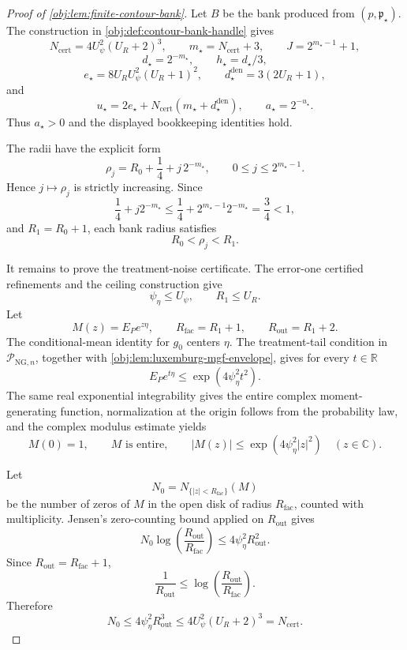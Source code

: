 \documentclass[11pt]{article}
\begin{document}
\begin{proof}[Proof of \cref{obj:lem:finite-contour-bank}]
Let \(B\) be the bank produced from \((p,\mathfrak p_\star)\).  The construction in \cref{obj:def:contour-bank-handle} gives
\[
N_{\mathrm{cert}}=4U_\psi^2(U_R+2)^3,\qquad
m_\star=N_{\mathrm{cert}}+3,\qquad
J=2^{m_\star-1}+1,
\]
\[
d_\star=2^{-m_\star},\qquad h_\star=d_\star/3,
\]
\[
e_\star=8U_RU_\psi^2(U_R+1)^2,\qquad
d_\star^{\mathrm{den}}=3(2U_R+1),
\]
and
\[
u_\star=2e_\star+N_{\mathrm{cert}}(m_\star+d_\star^{\mathrm{den}}),
\qquad
a_\star=2^{-u_\star}.
\]
Thus \(a_\star>0\) and the displayed bookkeeping identities hold. %

The radii have the explicit form
\[
\rho_j=R_0+\frac14+j\,2^{-m_\star},
\qquad 0\le j\le 2^{m_\star-1}.
\]
Hence \(j\mapsto\rho_j\) is strictly increasing.  Since
\[
\frac14+j2^{-m_\star}\le \frac14+2^{m_\star-1}2^{-m_\star}=\frac34<1,
\]
and \(R_1=R_0+1\), each bank radius satisfies
\[
R_0<\rho_j<R_1.
\]

It remains to prove the treatment-noise certificate.  The error-one certified refinements and the ceiling construction give
\[
\psi_\eta\le U_\psi,\qquad R_1\le U_R.
\]
Let
\[
M(z)=E_Pe^{z\eta},\qquad R_{\mathrm{fac}}=R_1+1,
\qquad R_{\mathrm{out}}=R_1+2.
\]
The conditional-mean identity for \(g_0\) centers \(\eta\).  The treatment-tail condition in \(\mathcal P_{\mathrm{NG},n}\), together with \cref{obj:lem:luxemburg-mgf-envelope}, gives for every \(t\in\mathbb R\)
\[
E_P e^{t\eta}\le \exp(4\psi_\eta^2t^2).
\]
The same real exponential integrability gives the entire complex moment-generating function, normalization at the origin follows from the probability law, and the complex modulus estimate yields
\[
M(0)=1,\qquad M\text{ is entire},\qquad
|M(z)|\le \exp(4\psi_\eta^2|z|^2)
\quad (z\in\mathbb C).
\]

Let
\[
N_0=N_{\{|z|<R_{\mathrm{fac}}\}}(M)
\]
be the number of zeros of \(M\) in the open disk of radius \(R_{\mathrm{fac}}\), counted with multiplicity.  Jensen's zero-counting bound applied on \(R_{\mathrm{out}}\) gives
\[
N_0\log\!\left(\frac{R_{\mathrm{out}}}{R_{\mathrm{fac}}}\right)
\le 4\psi_\eta^2R_{\mathrm{out}}^2.
\]
Since \(R_{\mathrm{out}}=R_{\mathrm{fac}}+1\),
\[
\frac1{R_{\mathrm{out}}}
\le
\log\!\left(\frac{R_{\mathrm{out}}}{R_{\mathrm{fac}}}\right).
\]
Therefore
\[
N_0
\le 4\psi_\eta^2R_{\mathrm{out}}^3
\le 4U_\psi^2(U_R+2)^3
=N_{\mathrm{cert}}.
\]


\end{proof}
\end{document}
